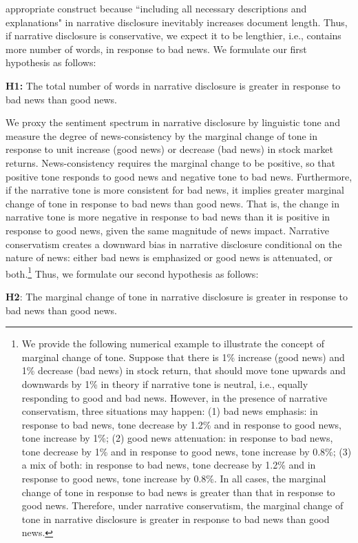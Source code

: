 \documentclass[a4paper]{article}
\begin{document}
\begin{spacing}{2}
appropriate construct because ``including all necessary descriptions and explanations"  in narrative disclosure inevitably increases document length. Thus, if narrative disclosure is conservative, we expect it to be lengthier, i.e., contains more number of words, in response to bad news. We formulate our first hypothesis as follows:

\begin{center}
	\textbf{H1:} The total number of words in narrative disclosure is greater in response to bad news than good news.
\end{center}

We proxy the sentiment spectrum in narrative disclosure by linguistic tone and measure the degree of news-consistency by the marginal change of tone in response to unit increase (good news) or decrease (bad news) in stock market returns. News-consistency requires the marginal change to be positive, so that positive tone responds to good news and negative tone to bad news. Furthermore, if the narrative tone is more consistent for bad news, it implies greater marginal change of tone in response to bad news than good news. That is, the change in narrative tone is more negative in response to bad news than it is positive in response to good news, given the same magnitude of news impact. Narrative conservatism creates a downward bias in narrative disclosure conditional on the nature of news: either bad news is emphasized or good news is attenuated, or both.\footnote{We provide the following numerical example to illustrate the concept of marginal change of tone. Suppose that there is 1\% increase (good news) and 1\% decrease (bad news) in stock return, that should move tone upwards and downwards by 1\% in theory if narrative tone is neutral, i.e., equally responding to good and bad news. However, in the presence of narrative conservatism, three situations may happen: (1) bad news emphasis: in response to bad news, tone decrease by 1.2\% and in response to good news, tone increase by 1\%; (2) good news attenuation: in response to bad news, tone decrease by 1\% and in response to good news, tone increase by 0.8\%; (3) a mix of both: in response to bad news, tone decrease by 1.2\% and in response to good news, tone increase by 0.8\%. In all cases, the marginal change of tone in response to bad news is greater than that in response to good news. Therefore, under narrative conservatism, the marginal change of tone in narrative disclosure is greater in response to bad news than good news.} Thus, we formulate our second hypothesis as follows:
\begin{center}
	\textbf{H2}: The marginal change of tone in narrative disclosure is greater in response to bad news than good news.
\end{center}


\end{spacing}
\end{document}
